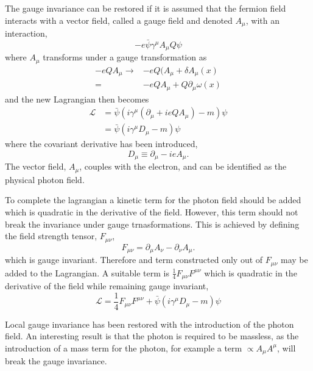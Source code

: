 The gauge invariance can be restored if it is assumed that the fermion field
interacts with a vector field, called a gauge field and denoted $A_{\mu}$, with
an interaction,
\begin{equation}
-e\bar{\psi}\gamma^{\mu}A_{\mu}Q\psi
\end{equation}
where $A_\mu$ transforms under a gauge transformation as 
\begin{align}
-eQA_{\mu} \to & -eQ(A_{\mu}+\delta A_{\mu}(x)\\
           =   & -e Q A_{\mu} + Q \partial_{\mu} \omega (x)
\end{align}
and the new Lagrangian then becomes
\begin{align}
\mathcal{L} 
&= \bar{\psi}( i\gamma^{\mu} ( \partial_{\mu} +i e Q A_{\mu}) - m)\psi \\
&= \bar{\psi}( i\gamma^{\mu} D_{\mu} - m)\psi 
\end{align}
where the covariant derivative has been introduced,
\begin{equation}
D_{\mu} \equiv \partial_{\mu} - i e A_{\mu}.
\label{eq:covar_deriv}
\end{equation}
The vector field, $A_{\mu}$, couples with the electron, and can be identified as
the physical photon field. 

To complete the lagrangian a kinetic term for the photon field should be added
which is quadratic in the derivative of the field.
However, this term should not break the invariance under gauge trnasformations.
This is achieved by defining the field strength tensor, $F_{\mu\nu}$,
\begin{equation}
F_{\mu\nu}
= \partial_{\mu} A_{\nu} - \partial_{\nu} A_{\mu}.
\label{eq:fieldstrengthtensor}
\end{equation}
which is gauge invariant. Therefore and term constructed only out of 
 $F_{\mu\nu}$ may be added to the Lagrangian.
A suitable term is $\frac{1}{4} F_{\mu\nu} F^{\mu\nu}$ which is quadratic in the
derivative of the field while remaining gauge invariant,
\begin{equation}
\mathcal{L} = \frac{1}{4} F_{\mu\nu} F^{\mu\nu} + \bar{\psi}( i\gamma^{\mu} D_{\mu} - m)\psi 
\end{equation}

Local gauge invariance has been restored with the introduction of the photon
field. An interesting result is that the photon is required to be massless, as
the introduction of a mass term for the photon, for example a term $\propto
A_{\mu}A^{\mu}$, will break the gauge invariance.

